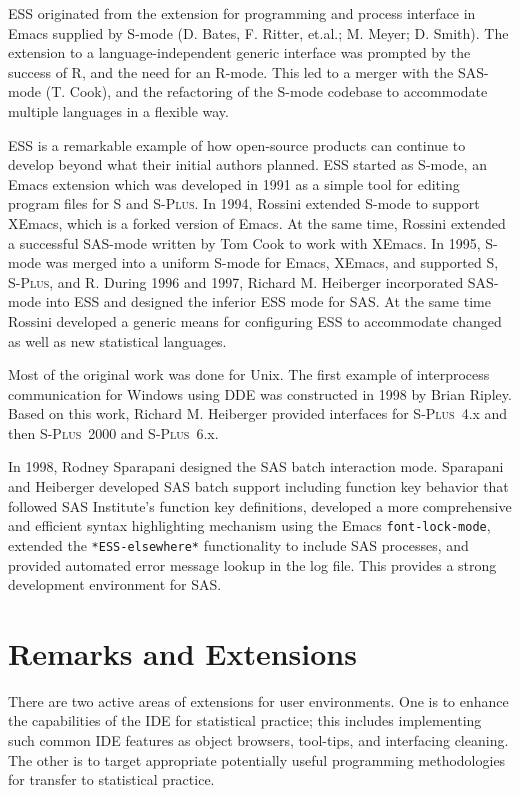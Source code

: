 \documentclass{article}
\newcommand*{\Splus}{\textsc{S-Plus}}
\newcommand{\stexttt}[1]{{\small\texttt{#1}}}
\begin{document}
ESS originated from the extension for programming and process
interface in Emacs supplied by S-mode (D. Bates, F. Ritter, et.al.; 
M. Meyer; D. Smith).  The extension to a language-independent generic
interface was prompted by the success of R, and the need for an
R-mode.  This led to a merger with the SAS-mode (T. Cook), and the
refactoring of the S-mode codebase to accommodate multiple languages
in a flexible way.

ESS is a remarkable example of how open-source products can continue
to develop beyond what their initial authors planned.  ESS started as
S-mode, an Emacs extension which was developed in 1991 as a simple
tool for editing program files for S and \Splus.  In 1994, Rossini
extended S-mode to support XEmacs, which is a forked version of Emacs.
At the same time, Rossini extended a successful SAS-mode written by
Tom Cook to work with XEmacs.  In 1995, S-mode was merged into a
uniform S-mode for Emacs, XEmacs, and supported S, \Splus, and R.
During 1996 and 1997, Richard M. Heiberger incorporated SAS-mode into
ESS and designed the inferior ESS mode for SAS.  At the same time
Rossini developed a generic means for configuring ESS to accommodate
changed as well as new statistical languages.

Most of the original work was done for Unix.  The first example of
interprocess communication for Windows using DDE was constructed in
1998 by Brian Ripley.  Based on this work, Richard M. Heiberger
provided interfaces for \Splus~4.x and then \Splus~2000 and
\Splus~6.x.

In 1998, Rodney Sparapani designed the SAS batch interaction
mode.  Sparapani and Heiberger developed SAS batch support including
function key behavior that followed SAS Institute's function key
definitions, developed a more comprehensive and efficient syntax
highlighting mechanism using the Emacs \stexttt{font-lock-mode},
extended the \stexttt{*ESS-elsewhere*} functionality to include SAS
processes, and provided automated error message lookup in the log
file.  This provides a strong development environment for SAS.

\section{Remarks and Extensions}
\label{sec:remarks}

There are two active areas of extensions for user environments.  One
is to enhance the capabilities of the IDE for statistical practice;
this includes implementing such common IDE features as object
browsers, tool-tips, and interfacing cleaning.  The other is to
target appropriate potentially useful programming methodologies for
transfer to statistical practice.
\end{document}
